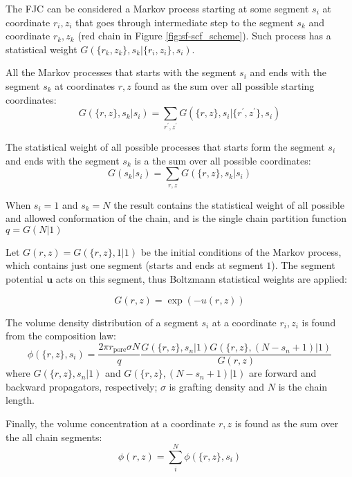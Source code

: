 \documentclass[12pt, a4paper]{article}
\begin{document}
The FJC can be considered a Markov process starting at some segment $s_{i}$ at coordinate $r_{i}, z_{i}$ that goes through intermediate step to the segment $s_{k}$ and coordinate $r_{k}, z_{k}$ (red chain in Figure \ref{fig:sf-scf_scheme}).
Such process has a statistical weight $G(\{r_{k}, z_{k}\}, s_{k} | \{r_{i}, z_{i}\}, s_{i})$.

All the Markov processes that starts with the segment $s_{i}$ and ends with the segment $s_{k}$ at coordinates ${r, z}$ found as the sum over all possible starting coordinates:
\begin{equation}
    G(\{r, z\}, s_{k} | s_{i}) = \sum_{r^{\prime}, z^{\prime}} G(\{r, z\}, s_{i} | \{r^{\prime}, z^{\prime}\}, s_{i})
\end{equation}

The statistical weight of all possible processes that starts form the segment $s_{i}$ and ends with the segment $s_{k}$ is a the sum over all possible coordinates:
\begin{equation}
    G(s_{k} | s_{i}) = \sum_{r, z} G(\{r, z\}, s_{k} | s_{i})
\end{equation}

When $s_{i}=1$ and $s_{k}=N$ the result contains the statistical weight of all possible and allowed conformation of the chain, and is the single chain partition function $q = G(N|1)$

Let $G(r, z) = G(\{r, z\}, 1|1)$ be the initial conditions of the Markov process, which contains just one segment (starts and ends at segment $1$).
The segment potential $\mathbf{u}$ acts on this segment, thus Boltzmann statistical weights are applied:

\begin{equation}
    G(r, z) = \exp(-u(r,z))
\end{equation}

The volume density distribution of a segment $s_i$ at a coordinate $r_{i}, z_{i}$ is found from the composition law:
\begin{equation}
    \label{eq:propagation}
    \phi(\{r, z\}, s_{i}) = \frac{2 \pi r_{\textrm{pore}} \sigma N}{q} \frac{G(\{r, z\}, s_n | 1) G(\{r, z\}, (N-s_n+1) | 1)}{G(r, z)}
\end{equation}
where $G(\{r, z\}, s_n | 1)$ and $G(\{r, z\}, (N-s_n+1) | 1)$ are forward and backward propagators, respectively; $\sigma$ is grafting density and $N$ is the chain length.

Finally, the volume concentration at a coordinate $r, z$ is found as the sum over the all chain segments:
\begin{equation}
    \phi(r, z) = \sum_{i}^{N} \phi(\{r, z\}, s_{i})
\end{equation}
\end{document}
